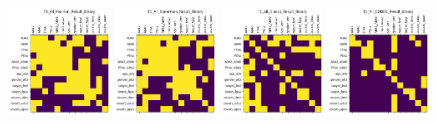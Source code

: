 \begin{figure}
    \includegraphics[width=0.24\textwidth]{chap6/figs/T1_All_Pearson_Result_Binary.png}
    \includegraphics[width=0.24\textwidth]{chap6/figs/T1_All_Spearman_Result_Binary.png}
    \includegraphics[width=0.24\textwidth]{chap6/figs/T1_All_Glasso_Result_Binary.png}
    \includegraphics[width=0.24\textwidth]{chap6/figs/T1_All_CODEC_Result_Binary.png}
    

\end{figure}
